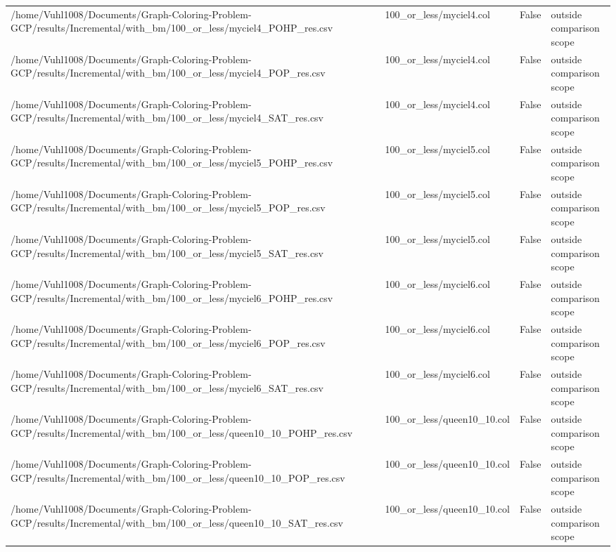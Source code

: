 \begin{table}[htbp]
\begin{tabular}{llll}
/home/Vuhl1008/Documents/Graph-Coloring-Problem-GCP/results/Incremental/with\_bm/100\_or\_less/myciel4\_POHP\_res.csv & 100\_or\_less/myciel4.col & False & outside comparison scope \\
/home/Vuhl1008/Documents/Graph-Coloring-Problem-GCP/results/Incremental/with\_bm/100\_or\_less/myciel4\_POP\_res.csv & 100\_or\_less/myciel4.col & False & outside comparison scope \\
/home/Vuhl1008/Documents/Graph-Coloring-Problem-GCP/results/Incremental/with\_bm/100\_or\_less/myciel4\_SAT\_res.csv & 100\_or\_less/myciel4.col & False & outside comparison scope \\
/home/Vuhl1008/Documents/Graph-Coloring-Problem-GCP/results/Incremental/with\_bm/100\_or\_less/myciel5\_POHP\_res.csv & 100\_or\_less/myciel5.col & False & outside comparison scope \\
/home/Vuhl1008/Documents/Graph-Coloring-Problem-GCP/results/Incremental/with\_bm/100\_or\_less/myciel5\_POP\_res.csv & 100\_or\_less/myciel5.col & False & outside comparison scope \\
/home/Vuhl1008/Documents/Graph-Coloring-Problem-GCP/results/Incremental/with\_bm/100\_or\_less/myciel5\_SAT\_res.csv & 100\_or\_less/myciel5.col & False & outside comparison scope \\
/home/Vuhl1008/Documents/Graph-Coloring-Problem-GCP/results/Incremental/with\_bm/100\_or\_less/myciel6\_POHP\_res.csv & 100\_or\_less/myciel6.col & False & outside comparison scope \\
/home/Vuhl1008/Documents/Graph-Coloring-Problem-GCP/results/Incremental/with\_bm/100\_or\_less/myciel6\_POP\_res.csv & 100\_or\_less/myciel6.col & False & outside comparison scope \\
/home/Vuhl1008/Documents/Graph-Coloring-Problem-GCP/results/Incremental/with\_bm/100\_or\_less/myciel6\_SAT\_res.csv & 100\_or\_less/myciel6.col & False & outside comparison scope \\
/home/Vuhl1008/Documents/Graph-Coloring-Problem-GCP/results/Incremental/with\_bm/100\_or\_less/queen10\_10\_POHP\_res.csv & 100\_or\_less/queen10\_10.col & False & outside comparison scope \\
/home/Vuhl1008/Documents/Graph-Coloring-Problem-GCP/results/Incremental/with\_bm/100\_or\_less/queen10\_10\_POP\_res.csv & 100\_or\_less/queen10\_10.col & False & outside comparison scope \\
/home/Vuhl1008/Documents/Graph-Coloring-Problem-GCP/results/Incremental/with\_bm/100\_or\_less/queen10\_10\_SAT\_res.csv & 100\_or\_less/queen10\_10.col & False & outside comparison scope \\

\end{tabular}
\end{table}
